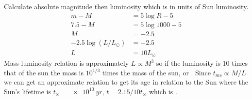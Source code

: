 \documentclass[newpage]{homework}
\begin{document}
\question
\begin{alphaparts}
    \questionpart Calculate absolute magnitude then luminosity which is in units of Sun luminosity.
        \begin{align*}
            m - M	&=	5 \log R - 5	\\
            7.5 - M   &=	5 \log 1000 - 5	\\
            M   &=  -2.5    \\
            -2.5 \log (L/L_\odot) &=  -2.5    \\
            L   &=  \boxed{10 L_\odot}
        \end{align*}
    \questionpart Mass-luminosity relation is approximately $L \propto M^3$ so if the luminosity is 10 times that of the sun the mass is $10^{1/3}$ times the mass of the sun, or .
    \questionpart Since $t_{ms} \propto M/L$ we can get an approximate relation to get its age in relation to the Sun where the Sun's lifetime is $t_\odot = \SI{e10}{yr}$, $t = 2.15 / 10 t_\odot$ which is .
\end{alphaparts}
\end{document}
